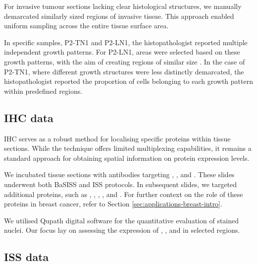 For invasive tumour sections lacking clear histological structures, we manually demarcated similarly sized regions of invasive tissue. This approach enabled uniform sampling across the entire tissue surface area.

In specific samples, P2-TN1 and P2-LN1, the histopathologist reported multiple independent growth patterns. For P2-LN1, areas were selected based on these growth patterns, with the aim of creating regions of similar size . In the case of P2-TN1, where different growth structures were less distinctly demarcated, the histopathologist reported the proportion of cells belonging to each growth pattern within predefined regions.

\subsection{\acl{IHC} data}
\label{sec:modalities-ihc}

\acl{IHC} serves as a robust method for localising specific proteins within tissue sections. While the technique offers limited multiplexing capabilities, it remains a standard approach for obtaining spatial information on protein expression levels.

We incubated tissue sections with antibodies targeting , , and . These slides underwent both BaSISS and ISS protocols. In subsequent slides, we targeted additional proteins, such as , , , , and . For further context on the role of these proteins in breast cancer, refer to Section \cref{sec:applications-breast-intro}.

We utilised Qupath digital software for the quantitative evaluation of stained nuclei. Our focus lay on assessing the expression of , , and  in selected regions.

\subsection{\acl{ISS} data}
\label{sec:modalities-iss}


